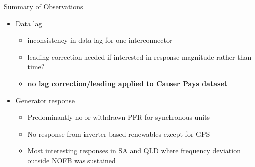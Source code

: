 \begin{frame}{Summary of Observations}
\begin{itemize}
\itemsep0em
\item Data lag
\begin{itemize}
    \item inconsistency in data lag for one interconnector
    \item leading correction needed if interested in response magnitude rather than time?
    \item \textbf{no lag correction/leading applied to Causer Pays dataset}
\end{itemize}
\item Generator response
\begin{itemize}
    \item Predominantly no or withdrawn PFR for synchronous units
    \item No response from inverter-based renewables except for GPS
    \item Most interesting responses in SA and QLD where frequency deviation outside NOFB was sustained
\end{itemize}
\end{itemize}
 
 \end{frame}